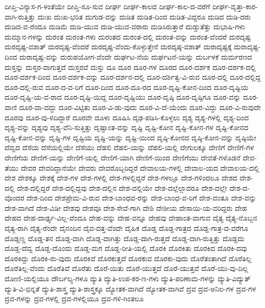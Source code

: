 {ದೀಪ್ತಿ-ವಿನ್ಯಾಸ-ಗ-ಳಂತೆಯೇ
ದೀಪ್ತಿ-ಸೂ-ಸುವ
ದೀರ್ಘ
ದೀರ್ಘ-ಕಾಲದ
ದೀರ್ಘ-ಕಾಲ-ದ-ವರೆಗೆ
ದೀರ್ಘ-ವೃತ್ತಾ-ಕಾರ-ವಾಗಿ-ರುತ್ತಿತ್ತು
ದುಃಖ
ದುಃಖ-ಭರಿತ
ದುಗುಡ-ವನ್ನು
ದುಡಿತ
ದುಡಿತ-ದಿಂದ
ದುಡಿತ-ವಿದ್ದರೂ
ದುಡಿದ
ದುಡಿ-ದರು
ದುಡಿದ-ವ-ರೆಂದೂ
ದುಡಿಮೆ
ದುಡಿ-ಯುವ
ದುಡಿ-ಯುವ-ವರಾರು
ದುಡಿಸಿರುತ್ತಾರೆ
ದುಡ್ಡುತೆತ್ತು
ದುಭಾಷಿ-ಗಳು
ದುಮ್ಮಾನ-ಗಳನ್ನು
ದುರಂತ
ದುರಂತ-ಗಳು
ದುರಂತದ
ದುರಂತ-ದಲ್ಲಿ
ದುರಂತ-ವನ್ನು
ದುರಂತ-ವೆಂದರೆ
ದುರದೃಷ್ಟ
ದುರದೃಷ್ಟ-ವಶಾತ್
ದುರದೃಷ್ಟ-ವೆಂದರೆ
ದುರದೃಷ್ಟ-ವೆಂದು-ಕೊಳ್ಳುತ್ತೇನೆ
ದುರದೃಷ್ಠ-ವಶಾತ್
ದುರಾದೃಷ್ಟಕ್ಕೆ
ದುರಾದೃಷ್ಟ-ದಿಂದ
ದುರಾದೃಷ್ಟ-ವನ್ನು
ದುರುಪಯೋಗ-ವೆಂದೇ
ದುರ್ಘಟ-ನೆಯ
ದುರ್ಘಟನೆ-ಯನ್ನು
ದುರ್ಬಳಕೆ
ದುರ್ಮರಣದ
ದುಸ್ತನ್ನು
ದುಸ್ತರ-ವಾಗುತ್ತದೆ
ದುಸ್ತರವೆ
ದುಸ್ತು
ದೂ
ದೂರ
ದೂರ-ಗಳ
ದೂರದ
ದೂರ-ದರ್ಶಕ
ದೂರ-ದರ್ಶಕ-ದಲ್ಲಿ
ದೂರ-ದರ್ಶಕ-ದಿಂದ
ದೂರ-ದರ್ಶಕ-ವನ್ನು
ದೂರ-ದರ್ಶನ-ದಲ್ಲಿ
ದೂರ-ದರ್ಶಿತ್ವ-ವಿ-ರುವ
ದೂರ-ದಲ್ಲಿ
ದೂರ-ದಲ್ಲಿದ್ದ
ದೂರ-ದಲ್ಲಿ-ರುವ
ದೂರ-ದ-ವ-ರಿಗೆ
ದೂರ-ದಿಂದ
ದೂರ-ದೂ-ರದ
ದೂರ-ದೃಷ್ಟಿ-ಕೋನ-ದಿಂದ
ದೂರ-ದೃಷ್ಟಿಯ
ದೂರ-ದೃಷ್ಟಿ-ಯ-ವ-ರಾದ
ದೂರ-ದೃಷ್ಟಿ-ಯಿದ್ದ
ದೂರ-ದೃಷ್ಟಿಯು
ದೂರ-ದೃಷ್ಠಿ
ದೂರ-ದೃಷ್ಠಿಗೂ
ದೂರ-ವನ್ನು
ದೂರ-ವಾಣಿ
ದೂರ-ವಾ-ದದ್ದು
ದೂರ-ವಿಟ್ಟಿತು
ದೂರ-ವಿ-ಡು-ವುದು
ದೂರ-ವಿ-ದೆ-ಯೆಂದು
ದೂರ-ವಿದ್ದು
ದೂರ-ವಿ-ರುವುದೇ
ದೂರವು
ದೂರ-ವು-ಳಿದಿದ್ದಾರೆ
ದೂರವೇ
ದೂಳು
ದೂಷಿಸಿ
ದೃಢ-ಪಡಿಸಿ-ಕೊಳ್ಳಲು
ದೃಶ್ಯ
ದೃಶ್ಯ-ಗಳಲ್ಲಿ
ದೃಶ್ಯ-ದಿಂದ
ದೃಶ್ಯ-ವನ್ನು
ದೃಶ್ಯವು
ದೃಶ್ಯ-ವೆನಿ-ಸುತ್ತಿತ್ತು
ದೃಷ್ಟಾಂತ-ವನ್ನು
ದೃಷ್ಟಿ
ದೃಷ್ಟಿ-ಕೋನ
ದೃಷ್ಟಿ-ಕೋನ-ಗಳ
ದೃಷ್ಟಿ-ಕೋನದ
ದೃಷ್ಟಿ-ಕೋನ-ವನ್ನು
ದೃಷ್ಟಿ-ಗಳ
ದೃಷ್ಟಿಯ
ದೃಷ್ಟಿ-ಯನ್ನು
ದೃಷ್ಟಿ-ಯಿಂದ
ದೃಷ್ಠಿ-ಕೋನದ
ದೃಷ್ಠಿ-ಕೋನ-ವನ್ನು
ದೃಷ್ಠಿಯೇ
ದೆವ್ವದ
ದೆಸೆಯ
ದೆಸೆಯಲ್ಲಿಯೇ
ದೆಸೆಯು
ದೆಹಲಿ
ದೆಹಲಿ-ಯನ್ನು
ದೆಹಲಿ-ಯಲ್ಲಿ
ದೇಗುಲಕ್ಕೂ
ದೇಣಿಗೆ
ದೇಣಿಗೆ-ಗಳ
ದೇಣಿಗೆಯ
ದೇಣಿಗೆ-ಯನ್ನು
ದೇಣಿಗೆ-ಯಲ್ಲಿ
ದೇಣಿಗೆ-ಯಾಗಿ
ದೇಣಿಗೆ-ಯಿಂದ
ದೇಣಿಗೆಯು
ದೇವತೆ-ಗಳೊಡನೆ
ದೇವ-ತೆಯು
ದೇವರ
ದೇವರಿದ್ದಾನೆಯೇ
ದೇವರು
ದೇವರೊಬ್ಬರಿದ್ದರೆ
ದೇವಾಲಯ-ಗಳಲ್ಲಿ
ದೇವಾಲ-ಯದ
ದೇವಾಲಯ-ದಲ್ಲಿ
ದೇಶ
ದೇಶಕ್ಕೂ
ದೇಶಕ್ಕೆ
ದೇಶ-ಗಳ
ದೇಶ-ಗಳಲ್ಲಿ
ದೇಶ-ಗಳಲ್ಲಿದ್ದರೆ
ದೇಶ-ಗಳಲ್ಲೂ
ದೇಶ-ಗಳಿಂದಲೂ
ದೇಶದ
ದೇಶ-ದಲ್ಲಿ
ದೇಶ-ದಲ್ಲಿದ್ದರೆ
ದೇಶ-ದಲ್ಲಿದ್ದವು
ದೇಶ-ದಲ್ಲಿನ
ದೇಶ-ದಲ್ಲಿಯೇ
ದೇಶ-ದಲ್ಲೆಲ್ಲಾದರೂ
ದೇಶ-ದಲ್ಲೇ
ದೇಶ-ದ-ವೊಂದರ
ದೇಶ-ದಿಂದ
ದೇಶಪ್ರೇಮ-ವಿ-ರುವ
ದೇಶ-ಬಾಂಧವ-ರನ್ನು
ದೇಶ-ಬಾಂಧ-ವ-ರಿಗೆ
ದೇಶ-ವಂತೂ
ದೇಶ-ವನ್ನು
ದೇಶ-ವಾಗಿದೆ
ದೇಶ-ವಿಡೀ
ದೇಶವು
ದೇಶವೂ
ದೇಶ-ಸೇವೆ-ಗಾಗಿ
ದೇಶಿ
ದೇಶೀಯ
ದೇಸಾಯಿ-ಯ-ವರಿದ್ದರು
ದೇಹ
ದೇಹದ
ದೇಹ-ದಾರ್ಢ್ಯ-ವಿಲ್ಲ-ವೆಂದೂ
ದೇಹ-ವನ್ನು
ದೇಹ-ವನ್ನೂ
ದೇಹವು
ದೇಹಾಂತ-ವಾಗುವ
ದೈತ್ಯ
ದೈತ್ಯ-ನೊಬ್ಬನ
ದೈತ್ಯ-ರಾಗಿ
ದೈತ್ಯ-ರೆಂದೇ
ದೈನಂದಿನ
ದೈವ-ದತ್ತ-ವೆಂದೇ
ದೈಹಿಕ
ದೊಡ್ಡ
ದೊಡ್ಡ-ಗಾತ್ರದ
ದೊಡ್ಡ-ಗಾತ್ರ-ದ-ವರೆಗೂ
ದೊಡ್ಡಣ್ಣ
ದೊಡ್ಡ-ತನ
ದೊಡ್ಡ-ದಾಗಿ
ದೊಡ್ಡ-ದಾಗಿತ್ತು
ದೊಡ್ಡ-ದಾಗಿ-ರುತ್ತದೆ
ದೊಡ್ಡ-ದಾಗಿ-ರುತ್ತಿತ್ತು
ದೊಡ್ಡದು
ದೊಡ್ಡ-ದೆವ್ವ
ದೊಡ್ಡ-ದೊಂದು
ದೊಡ್ಡ-ಮಗ
ದೊಡ್ಡ-ರೀತಿ-ಯಲ್ಲಿ
ದೊರಕಿ
ದೊರಕಿತು
ದೊರಕಿದ
ದೊರಕಿ-ದವು
ದೊರಕಿದ್ದು
ದೊರಕಿ-ರು-ವುದು
ದೊರಕಿವೆ
ದೊರಕುತ್ತದೆ
ದೊರಕುವ
ದೊರಕು-ವುದು
ದೊರೆತಂತಾಗಿದೆ
ದೊರೆತಿಲ್ಲ
ದೊರೆತಿಲ್ಲ-ವೆಂದು
ದೊರೆತಿವೆ
ದೊರೆತು
ದೊರೆ-ಯಿತು
ದೊರೆ-ಯುತ್ತದೆ
ದೊರೆ-ಯುತ್ತವೆ
ದೊರೆ-ಯು-ವು-ದಿಲ್ಲ
ದೋಣಿ-ಯಲ್ಲಿಯೂ
ದೌರ್ಬಲ್ಯ-ಗಳೂ
ದ್ಯುತಿ
ದ್ಯುತಿ-ಉಪ-ಕರ-ಣ-ಗಳು
ದ್ಯುತಿ-ಪರಿಣಾಮ-ಗಳನ್ನು
ದ್ಯುತಿ-ವಿದ್ಯುತ್
ದ್ಯುತಿ-ವಿ-ಭಿನ್ನತೆ
ದ್ಯುತಿ-ಶಾಸ್ತ್ರ
ದ್ಯುತಿ-ಶಾಸ್ತ್ರಕ್ಕೂ
ದ್ಯೋತಕ-ವಾಗಿದೆ
ದ್ಯೋತಕ-ವಾಗಿವೆ
ದ್ರವ
ದ್ರವ-ಅನಿಲ-ಗಳ
ದ್ರವ-ಗಳ
ದ್ರವ-ಗಳನ್ನು
ದ್ರವ-ಗಳಲ್ಲಿ
ದ್ರವ-ಗಳಲ್ಲಿಯೂ
ದ್ರವ-ಗಳಿ-ಗಿಂತಲೂ
}
